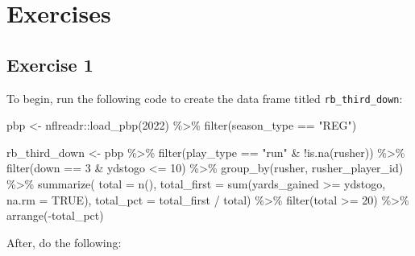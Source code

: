 \documentclass[
  letterpaper,
]{krantz}
\newenvironment{Shaded}{\begin{snugshade}}{\end{snugshade}}
\newcommand{\AttributeTok}[1]{\textcolor[rgb]{0.40,0.45,0.13}{#1}}
\newcommand{\ConstantTok}[1]{\textcolor[rgb]{0.56,0.35,0.01}{#1}}
\newcommand{\DecValTok}[1]{\textcolor[rgb]{0.68,0.00,0.00}{#1}}
\newcommand{\FunctionTok}[1]{\textcolor[rgb]{0.28,0.35,0.67}{#1}}
\newcommand{\NormalTok}[1]{\textcolor[rgb]{0.00,0.23,0.31}{#1}}
\newcommand{\OtherTok}[1]{\textcolor[rgb]{0.00,0.23,0.31}{#1}}
\newcommand{\SpecialCharTok}[1]{\textcolor[rgb]{0.37,0.37,0.37}{#1}}
\newcommand{\StringTok}[1]{\textcolor[rgb]{0.13,0.47,0.30}{#1}}
\begin{document}
\hypertarget{exercises-2}{%
\section{Exercises}\label{exercises-2}}

\hypertarget{exercise-1-2}{%
\subsection{Exercise 1}\label{exercise-1-2}}

To begin, run the following code to create the data frame titled
\texttt{rb\_third\_down}:

\begin{Shaded}
\begin{Highlighting}[]
\NormalTok{pbp }\OtherTok{\textless{}{-}}\NormalTok{ nflreadr}\SpecialCharTok{::}\FunctionTok{load\_pbp}\NormalTok{(}\DecValTok{2022}\NormalTok{) }\SpecialCharTok{\%\textgreater{}\%}
  \FunctionTok{filter}\NormalTok{(season\_type }\SpecialCharTok{==} \StringTok{"REG"}\NormalTok{)}

\NormalTok{rb\_third\_down }\OtherTok{\textless{}{-}}\NormalTok{ pbp }\SpecialCharTok{\%\textgreater{}\%}
  \FunctionTok{filter}\NormalTok{(play\_type }\SpecialCharTok{==} \StringTok{"run"} \SpecialCharTok{\&} \SpecialCharTok{!}\FunctionTok{is.na}\NormalTok{(rusher)) }\SpecialCharTok{\%\textgreater{}\%}
  \FunctionTok{filter}\NormalTok{(down }\SpecialCharTok{==} \DecValTok{3} \SpecialCharTok{\&}\NormalTok{ ydstogo }\SpecialCharTok{\textless{}=} \DecValTok{10}\NormalTok{) }\SpecialCharTok{\%\textgreater{}\%}
  \FunctionTok{group\_by}\NormalTok{(rusher, rusher\_player\_id) }\SpecialCharTok{\%\textgreater{}\%}
  \FunctionTok{summarize}\NormalTok{(}
    \AttributeTok{total =} \FunctionTok{n}\NormalTok{(),}
    \AttributeTok{total\_first =} \FunctionTok{sum}\NormalTok{(yards\_gained }\SpecialCharTok{\textgreater{}=}\NormalTok{ ydstogo, }\AttributeTok{na.rm =} \ConstantTok{TRUE}\NormalTok{),}
    \AttributeTok{total\_pct =}\NormalTok{ total\_first }\SpecialCharTok{/}\NormalTok{ total) }\SpecialCharTok{\%\textgreater{}\%}
  \FunctionTok{filter}\NormalTok{(total }\SpecialCharTok{\textgreater{}=} \DecValTok{20}\NormalTok{) }\SpecialCharTok{\%\textgreater{}\%}
  \FunctionTok{arrange}\NormalTok{(}\SpecialCharTok{{-}}\NormalTok{total\_pct)}
\end{Highlighting}
\end{Shaded}

After, do the following:
\end{document}
